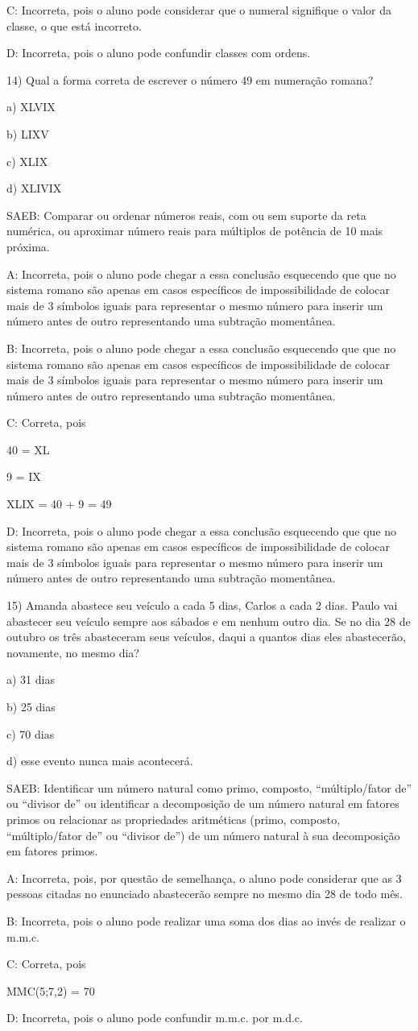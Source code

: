 C: Incorreta, pois o aluno pode considerar que o numeral signifique o
valor da classe, o que está incorreto.

D: Incorreta, pois o aluno pode confundir classes com ordens.

14) Qual a forma correta de escrever o número 49 em numeração romana?

a) XLVIX

b) LIXV

c) XLIX

d) XLIVIX

SAEB: Comparar ou ordenar números reais, com ou sem suporte da reta
numérica, ou aproximar número reais para múltiplos de potência de 10
mais próxima.

A: Incorreta, pois o aluno pode chegar a essa conclusão esquecendo que
que no sistema romano são apenas em casos específicos de impossibilidade
de colocar mais de 3 símbolos iguais para representar o mesmo número
para inserir um número antes de outro representando uma subtração
momentânea.

B: Incorreta, pois o aluno pode chegar a essa conclusão esquecendo que
que no sistema romano são apenas em casos específicos de impossibilidade
de colocar mais de 3 símbolos iguais para representar o mesmo número
para inserir um número antes de outro representando uma subtração
momentânea.

C: Correta, pois

40 = XL

9 = IX

XLIX = 40 + 9 = 49

D: Incorreta, pois o aluno pode chegar a essa conclusão esquecendo que
que no sistema romano são apenas em casos específicos de impossibilidade
de colocar mais de 3 símbolos iguais para representar o mesmo número
para inserir um número antes de outro representando uma subtração
momentânea.

15) Amanda abastece seu veículo a cada 5 dias, Carlos a cada 2 dias.
Paulo vai abastecer seu veículo sempre aos sábados e em nenhum outro
dia. Se no dia 28 de outubro os três abasteceram seus veículos, daqui a
quantos dias eles abastecerão, novamente, no mesmo dia?

a) 31 dias

b) 25 dias

c) 70 dias

d) esse evento nunca mais acontecerá.

SAEB: Identificar um número natural como primo, composto,
``múltiplo/fator de'' ou ``divisor de'' ou identificar a decomposição de
um número natural em fatores primos ou relacionar as propriedades
aritméticas (primo, composto, ``múltiplo/fator de'' ou ``divisor de'')
de um número natural à sua decomposição em fatores primos.

A: Incorreta, pois, por questão de semelhança, o aluno pode considerar
que as 3 pessoas citadas no enunciado abastecerão sempre no mesmo dia 28
de todo mês.

B: Incorreta, pois o aluno pode realizar uma soma dos dias ao invés de
realizar o m.m.c.

C: Correta, pois

MMC(5;7,2) = 70

D: Incorreta, pois o aluno pode confundir m.m.c. por m.d.c.
